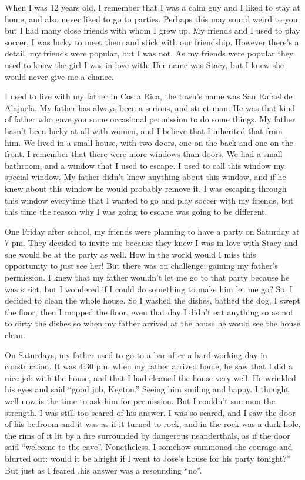 \clearpage
{}
\beginessay
When I was 12 years old, I remember that I was a calm guy and I liked to stay at home, and also never liked to go to parties. Perhaps this may sound weird to you, but I had many close friends with whom I grew up. My friends and  I used to play soccer,  I was lucky to meet them and stick with our friendship. However there’s a detail, my friends were popular, but I was not. As my friends were popular they used to know the girl I was in love with. Her name was Stacy, but I knew she would never give me a chance.

I used to live with my father in Costa Rica, the town’s name was San Rafael de Alajuela. My father has always been a serious, and strict man. He was that kind of father who gave you some occasional permission to do some things. My father hasn’t been lucky at all with women, and I believe that I inherited that from him. We lived in a small house, with two doors, one on the back and one on the front. I remember that there were more windows than doors. We had a small bathroom, and a window that I used to escape. I used to call this window my special window. My father didn’t know anything about this window, and if he knew about this window he would probably remove it. I was escaping through this window everytime that I wanted to go and play soccer with my friends, but this time the reason why I was going to escape was going to be different.

One Friday after school, my friends were planning to have a party on Saturday at 7 pm. They decided to invite me because they knew I was in love with Stacy and she would be at the party as well. How in the world would I miss this opportunity to just see her! But there was on challenge: gaining my father’s permission. I knew that my father wouldn’t let me go to that party because he was strict, but I wondered if I could do something to make him let me go? So, I decided to clean the whole house. So I washed the dishes, bathed the dog, I swept the floor, then I mopped the floor, even that day I didn’t eat anything so as not to dirty the dishes so when my father arrived at the house he would see the house clean. 

On Saturdays, my father used to go to a bar after a hard working day in construction. It was 4:30 pm, when my father arrived home, he saw that I did a nice job with the house, and that I had cleaned the house very well. He wrinkled his eyes and said “good job, Keyton.” Seeing him smiling and happy. I thought, well now is the time to ask him for permission. But I couldn’t summon the strength. I was still too scared of his answer. I was so scared, and I saw the door of his bedroom and it was as if it turned to rock, and in the rock was a dark hole, the rims of it lit by a fire surrounded by dangerous neanderthals, as if the door said “welcome to the cave”. Nonetheless, I somehow summoned the courage and blurted out: would it be alright if I went to Jose’s house for his party tonight?” But just as I feared ,his answer was a resounding “no”. 

